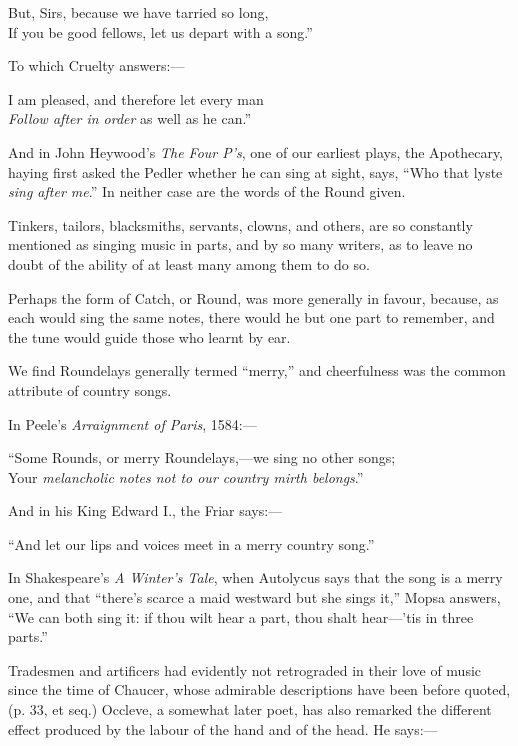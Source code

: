 \begin{scverse}But, Sirs, because we have tarried so long,\\
If you be good fellows, let us depart with a song.”
\end{scverse}
To which Cruelty answers:—
\begin{scverse}I am pleased, and therefore let every man\\
\textit{Follow after in order} as well as he can.”
\end{scverse}
\pagebreak
And in John Heywood’s \textit{The Four P’s}, one of our earliest plays, the Apothecary,
haying first asked the Pedler whether he can sing at sight, says, “Who that lyste
\textit{sing after me}.” In neither case are the words of the Round given.

Tinkers, tailors, blacksmiths, servants, clowns, and others, are so constantly
mentioned as singing music in parts, and by so many writers, as to leave no doubt
of the ability of at least many among them to do so.

Perhaps the form of Catch, or Round, was more generally in favour, because,
as each would sing the same notes, there would he but one part to remember, and
the tune would guide those who learnt by ear.

We find Roundelays generally termed “merry,” and cheerfulness was the
common attribute of country songs.

In Peele’s \textit{Arraignment of Paris}, 1584:—

\begin{scverse}
“Some Rounds, or merry Roundelays,—we sing no other songs;\\
Your \textit{melancholic notes not to our country mirth belongs}.”
\end{scverse}

And in his King Edward I., the Friar says:—

\begin{scverse}
“And let our lips and voices meet in a merry country song.”
\end{scverse}

In Shakespeare’s \textit{A Winter’s Tale}, when Autolycus says that the song is a
merry one, and that “there’s scarce a maid westward but she sings it,” Mopsa
answers, “We can both sing it: if thou wilt hear a part, thou shalt hear—’tis
in three parts.”

Tradesmen and artificers had evidently not retrograded in their love of music
since the time of Chaucer, whose admirable descriptions have been before quoted,
(p. 33, et seq.) Occleve, a somewhat later poet, has also remarked the different
effect produced by the labour of the hand and of the head. He says:—

